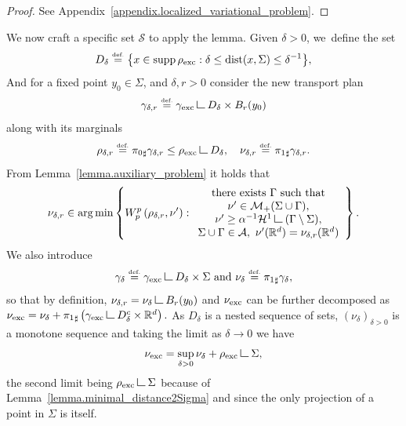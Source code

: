 \documentclass[10pt]{amsart}
\theoremstyle{definition}
\newcommand{\eqdef}{\ensuremath{\stackrel{\mbox{\upshape\tiny def.}}{=}}}
\newcommand\LM[1]{\hbox{\vrule width.5pt \vbox to#1pt{\vfill \hrule width#1pt height.5pt}}}
\newcommand\LL{{\mathchoice {\>\LM7\>}{\>\LM7\>}{\,\LM5\,}{\,\LM{3.35}\,}}}
\newcommand{\mres}{\LL}
\newcommand{\RR}{\mathbb{R}}
\DeclareMathOperator*{\argmin}{arg\,min}
\DeclareMathOperator{\dist}{dist}
\DeclareMathOperator{\supp}{supp}
\newcommand{\nuexc}{\nu_{\textup{exc}}}
\newcommand{\rhoexc}{\rho_{\textup{exc}}}
\newcommand{\gammaexc}{\gamma_{\textup{exc}}}
\begin{document}
\begin{proof} See Appendix~\ref{appendix.localized_variational_problem}.
\end{proof}
We now craft a specific set $\mathcal{S}$ to apply the lemma.
Given $\delta>0$, we~define the
set
\begin{equation} \label{set_D_delta}
D_{\delta} \eqdef
\bigl\{
x \in \supp\rhoexc :
\delta \le \dist(x, \Sigma) \le \delta^{-1}
\bigr\},
\end{equation}
And for a fixed point $y_0 \in \Sigma$, and $\delta,r>0$ consider the new transport plan
\begin{equation}\label{gamma_delta}
\gamma_{\delta, r} \eqdef \gammaexc \mres D_{\delta}\times B_r(y_0)
\end{equation}
along with its marginals\vspace*{-3pt}
\begin{equation}\label{nu_delta}
\rho_{\delta, r} \eqdef {\pi_{0}}_\sharp\gamma_{\delta,r} \le \rhoexc \mres D_{\delta},
\quad
\nu_{\delta, r} \eqdef {\pi_{1}}_\sharp\gamma_{\delta, r}.
\end{equation}
From Lemma~\ref{lemma.auxiliary_problem} it holds that
\begin{equation}\label{auxiliary_problem}
\nu_{\delta, r}
\in
\argmin
\left\{
W_p^p\left(
\rho_{\delta, r}, \nu'
\right) :
\begin{array}{c}
\text{there exists $\Gamma$ such that}\\
\nu' \in \mathcal{M}_+(\Sigma \cup \Gamma),\\
\nu' \ge \alpha^{-1}\mathcal{H}^1\mres (\Gamma\setminus\Sigma), \\
\Sigma \cup \Gamma \in \mathcal{A}, \
\nu'(\RR^d) = \nu_{\delta, r}(\RR^d)
\end{array}
\right\}.
\end{equation}
We also introduce\vspace*{-3pt}
\begin{equation}\label{measure_nu_delta}
\gamma_\delta\eqdef\gammaexc\mres D_{\delta}\times\Sigma
\text{ and }
\nu_\delta \eqdef {\pi_1}_\sharp \gamma_\delta,
\end{equation}
so that by definition, $\nu_{\delta, r} = \nu_\delta \mres B_r(y_0)$ and $\nuexc$ can be further decomposed as
$
\nuexc = \nu_\delta + {\pi_{1}}_\sharp\left(\gammaexc \mres D_\delta^c \times \RR^d\right).
$
As $D_\delta$ is a nested sequence of sets, $(\nu_\delta)_{\delta > 0}$ is a monotone sequence and taking the limit as $\delta \to 0$ we have
\begin{equation}\label{nuexc.further_decomposition}
\nuexc = \sup_{\delta > 0} \nu_\delta + \rhoexc\mres \Sigma,
\end{equation}
the second limit being $\rhoexc\mres \Sigma$ because
of Lemma~\ref{lemma.minimal_distance2Sigma} and
since the only projection of a point in $\Sigma$ is itself.
\end{document}
